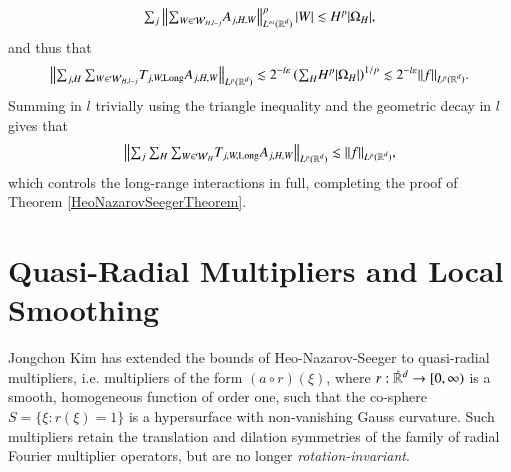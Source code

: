 %
\begin{equation}
  {\textstyle \sum\nolimits_j} \left\| {\textstyle \sum\nolimits_{W \in \mathcal{W}_{H,l-j}}} A_{j,H,W} \right\|_{L^\infty(\operatorname{\mathbb{R}}^d)}^p |W| \lesssim H^p |\Omega_H|,
\end{equation}
%
and thus that
%
\begin{equation}
  \left\| {\textstyle \sum\nolimits_{j,H} \sum\nolimits_{W \in \mathcal{W}_{H,l-j}}} T_{j,W,\text{Long}} A_{j,H,W} \right\|_{L^p(\operatorname{\mathbb{R}}^d)} \lesssim 2^{-l \varepsilon} \left( {\textstyle \sum\nolimits_H} H^p |\Omega_H| \right)^{1/p} \lesssim 2^{-l\varepsilon} \| f \|_{L^p(\operatorname{\mathbb{R}}^d)}.
\end{equation}
%
Summing in $l$ trivially using the triangle inequality and the geometric decay in $l$ gives that
%
\begin{equation}
  \left\| {\textstyle \sum\nolimits_j \sum\nolimits_H \sum\nolimits_{W \in \mathcal{W}_{H}}} T_{j,W,\text{Long}} A_{j,H,W} \right\|_{L^p(\operatorname{\mathbb{R}}^d)} \lesssim \| f \|_{L^p(\operatorname{\mathbb{R}}^d)},
\end{equation}
%
which controls the long-range interactions in full, completing the proof of Theorem \ref{HeoNazarovSeegerTheorem}.

%
%






\section{Quasi-Radial Multipliers and Local Smoothing}

Jongchon Kim \cite{KimQuasiradial} has extended 
the bounds of Heo-Nazarov-Seeger to quasi-radial multipliers, i.e. multipliers of the form $(a \circ r)(\xi)$, where $r: {\dot{\RR}{\vphantom{\RR}}^d} \to [0,\infty)$ is a smooth, homogeneous function of order one, such that the co-sphere $S = \{ \xi : r(\xi) = 1 \}$ is a hypersurface with non-vanishing Gauss curvature. Such multipliers retain the translation and dilation symmetries of the family of radial Fourier multiplier operators, but are no longer \emph{rotation-invariant}.

